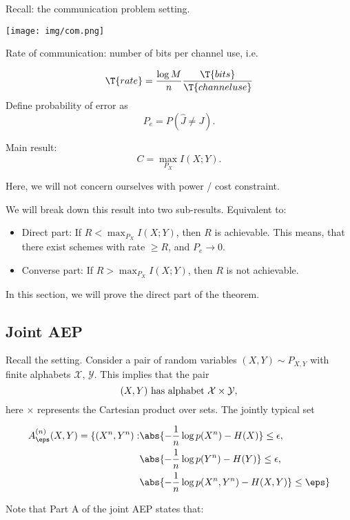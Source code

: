 Recall: the communication problem setting.

\texttt{[image: img/com.png]}

Rate of communication: number of bits per channel use, i.e.

\[
  \T{rate} = \frac{\log M}{n} \frac{\T{bits}}{\T{channel use}}
\]
Define probability of error as
\[
  P_e = P(\hat{J} \neq J).
\]

Main result:
\[
  C = \max_{P_X} I(X; Y).
\]

Here, we will not concern ourselves with power / cost constraint.

We will break down this result into two sub-results. Equivalent to:

\begin{itemize}
  \item Direct part: If $R < \max_{P_X} I(X; Y)$, then $R$ is achievable.  This means, that there exist schemes with rate $\geq R$, and $P_e \to 0$.
  \item Converse part: If $R > \max_{P_X} I(X; Y)$, then $R$ is not achievable.
\end{itemize}

In this section, we will prove the direct part of the theorem.

\subsection{Joint AEP}
Recall the setting.  Consider a pair of random variables $(X, Y) \sim P_{X, Y}$ with finite alphabets $\mathcal{X}$, $\mathcal{Y}$.  This implies that the pair
\[
  (X, Y) \text{ has alphabet } \mathcal{X} \times \mathcal{Y},
\]
here $\times$ represents the Cartesian product over sets.
The jointly typical set

\begin{align*}
  A_{\eps}^{(n)} (X, Y) = \{ (X^n, Y^n): & \abs{- \frac{1}{n} \log p(X^n) - H(X)} \leq \epsilon, \\  
    & \abs{-\frac{1}{n} \log p(Y^n) - H(Y)} \leq \epsilon, \\ 
& \abs{-\frac{1}{n} \log p(X^n, Y^n) - H(X, Y)} \leq \eps \} 
\end{align*}

Note that Part A of the joint AEP states that:

